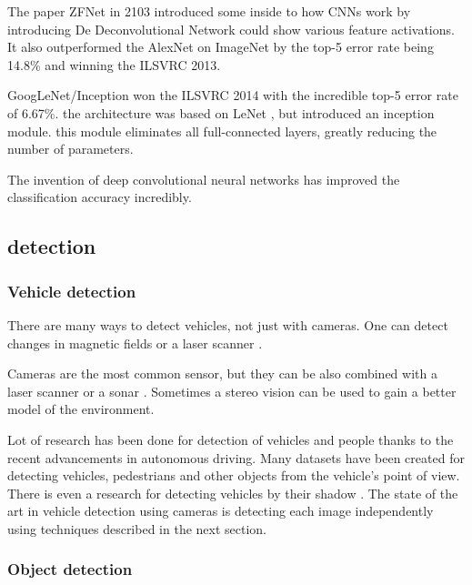 \documentclass[a4paper,12pt,titlepage, twoside]{article}
\numberwithin{figure}{section}
\begin{document}
The paper ZFNet \cite{zeiler2014visualizing} in 2103 introduced some inside to how CNNs work by introducing De Deconvolutional Network could show various feature activations. It also outperformed the AlexNet on ImageNet by the top-5 error rate being 14.8\% and winning the ILSVRC 2013.

GoogLeNet/Inception won the ILSVRC 2014 with the incredible top-5 error rate of 6.67\%. the architecture was based on LeNet \cite{lecun1998gradient}, but introduced an inception module. this module eliminates all full-connected layers, greatly reducing the number of parameters.





The invention of deep convolutional neural networks \cite{krizhevsky2012imagenet, lecun1989backpropagation} has improved the classification accuracy incredibly.

\subsection{detection}
\subsubsection{Vehicle detection}
There are many ways to detect vehicles, not just with cameras. One can detect changes in magnetic fields \cite{daubaras2012vehicle, caruso1999vehicle} or a laser scanner \cite{gate2009fast}.

Cameras are the most common sensor, but they can be also combined with a laser scanner \cite{wender20083d, premebida2007lidar} or a sonar \cite{kim2005front, wang2003online}. Sometimes a stereo vision \cite{bertozzi2000stereo, toulminet2006vehicle} can be used to gain a better model of the environment.

Lot of research has been done for detection of vehicles and people thanks to the recent advancements in autonomous driving. Many datasets have been created \cite{apollo-scape, madhavan2017bdd, RobotCarDatasetIJRR, ncarlevaris-2015a} for detecting vehicles, pedestrians and other objects from the vehicle's point of view. There is even a research for detecting vehicles by their shadow \cite{tzomakas1998vehicle}. The state of the art in vehicle detection using cameras is detecting each image independently using techniques described in the next section.


\subsubsection{Object detection}
\end{document}
